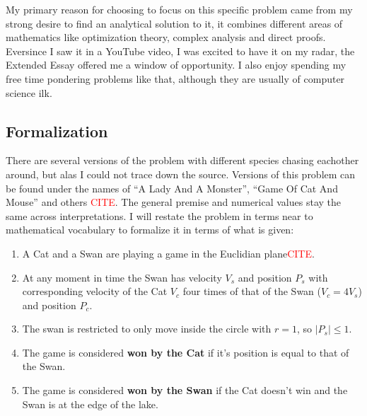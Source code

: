 \documentclass[12pt]{article}
\begin{document}
My primary reason for choosing to focus on this specific problem came from my strong desire to find an analytical solution to it, it combines different areas of mathematics like optimization theory, complex analysis and direct proofs. Eversince I saw it in a YouTube video\cite{Catandmouse}, I was excited to have it on my radar, the Extended Essay offered me a window of opportunity. I also enjoy spending my free time pondering problems like that, although they are usually of computer science ilk.

\subsection{Formalization}
There are several versions of the problem with different species chasing eachother around, but alas I could not trace down the source. Versions of this problem can be found under the names of ``A Lady And A Monster''\cite{ladyandmonster}, ``Game Of Cat And Mouse''\cite{Catandmouse} and others 
\textcolor{red}{CITE}. The general premise and numerical values stay the same across interpretations. I will restate the problem in terms near to mathematical vocabulary to formalize it in terms of what is given:

\begin{enumerate}
	\item A Cat and a Swan are playing a game in the Euclidian plane\textcolor{red}{CITE}. 
	\item At any moment in time the Swan has velocity $V_s$ and position $P_s$ with corresponding velocity of the Cat $V_c$ four times of that of the Swan ($V_c = 4V_s$) and position $P_c$.
	\item The swan is restricted to only move inside the circle with $r = 1$, so $|P_s| \leq 1$.
	\item The game is considered \textbf{won by the Cat} if it's position is equal to that of the Swan.
	\item The game is considered \textbf{won by the Swan} if the Cat doesn't win and the Swan is at the edge of the lake.
\end{enumerate}
\end{document}
